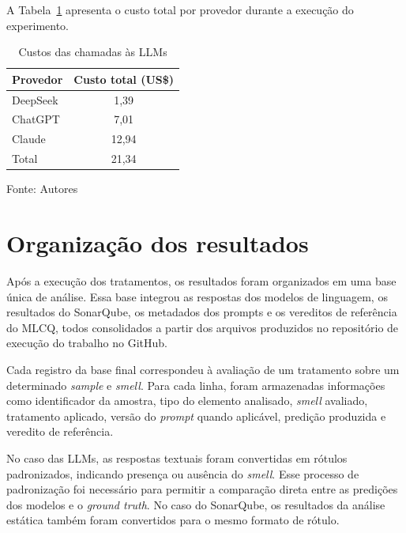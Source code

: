 A Tabela~\ref{tab:custos-llms} apresenta o custo total por provedor durante a execução do experimento.

\begin{table}[H]
\centering
\caption{Custos das chamadas às LLMs}
\label{tab:custos-llms}
\begin{tabular}{lc}
\hline
Provedor & Custo total (US\$) \\
\hline
DeepSeek & 1,39 \\
ChatGPT & 7,01 \\
Claude & 12,94 \\
\hline
Total & 21,34 \\
\hline
\end{tabular}

Fonte: Autores
\end{table}

\section{Organização dos resultados}

Após a execução dos tratamentos, os resultados foram organizados em uma base única de análise. Essa base integrou as respostas dos modelos de linguagem, 
os resultados do SonarQube, os metadados dos prompts e os vereditos de referência do MLCQ, todos consolidados a partir dos arquivos produzidos no repositório de execução do trabalho no GitHub.

Cada registro da base final correspondeu à avaliação de um tratamento sobre um determinado \textit{sample} e \textit{smell}. 
Para cada linha, foram armazenadas informações como identificador da amostra, tipo do elemento analisado, \textit{smell} avaliado, 
tratamento aplicado, versão do \textit{prompt} quando aplicável, predição produzida e veredito de referência.

No caso das LLMs, as respostas textuais foram convertidas em rótulos padronizados, indicando presença ou ausência do \textit{smell}. 
Esse processo de padronização foi necessário para permitir a comparação direta entre as predições dos modelos e o \textit{ground truth}. 
No caso do SonarQube, os resultados da análise estática também foram convertidos para o mesmo formato de rótulo.



